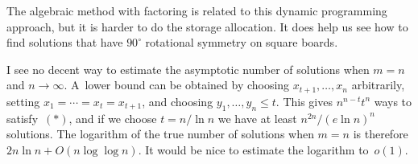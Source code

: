The algebraic method with factoring is related to this dynamic programming
approach, but it is harder to do the storage allocation. It does help us see
how to find solutions that have $90^{\circ}$ rotational symmetry on square
boards.

I see no decent way to estimate the asymptotic number of solutions when 
$m=n$ and $n\rightarrow\infty$.
A~lower bound can be obtained by choosing $x_{t+1},\ldots,x_n$ arbitrarily,
setting $x_1=\cdots =x_t=x_{t+1}$, and choosing $y_1,\ldots,y_n\leq t$.
This gives $n^{n-t}t^n$ ways to satisfy~$(\ast)$, and if we choose $t=n/\ln n$
we have at least $n^{2n}/(e\ln n)^n$ solutions. The logarithm of the true
number of solutions when $m=n$ is therefore $2n\ln n+O(n\log\log n)$. It would
be nice to estimate the logarithm to~$o(1)$.

\bye
